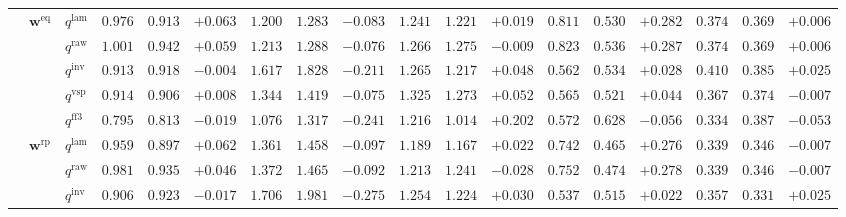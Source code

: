\documentclass[eng]{kjas3}
\begin{document}
\begin{table}[t]
{\begin{tabular}{lll ccc ccc ccc ccc ccc}
\cmidrule(lr){2-18}
 & $\mathbf{w}^{\mathrm{eq}}$ & $q^{\mathrm{lam}}$ & $0.976$ & $0.913$ & \cellcolor{posgreen!50}$+0.063$ & $1.200$ & $1.283$ & \cellcolor{negred!50}$-0.083$ & $1.241$ & $1.221$ & \cellcolor{posgreen!50}$+0.019$ & $0.811$ & $0.530$ & \cellcolor{posgreen!50}$+0.282$ & $0.374$ & $0.369$ & \cellcolor{posgreen!50}$+0.006$ \\
 &  & $q^{\mathrm{raw}}$ & $1.001$ & $0.942$ & \cellcolor{posgreen!50}$+0.059$ & $1.213$ & $1.288$ & \cellcolor{negred!50}$-0.076$ & $1.266$ & $1.275$ & \cellcolor{negred!50}$-0.009$ & $0.823$ & $0.536$ & \cellcolor{posgreen!50}$+0.287$ & $0.374$ & $0.369$ & \cellcolor{posgreen!50}$+0.006$ \\
 &  & $q^{\mathrm{inv}}$ & $0.913$ & $0.918$ & \cellcolor{negred!50}$-0.004$ & $1.617$ & $1.828$ & \cellcolor{negred!50}$-0.211$ & $1.265$ & $1.217$ & \cellcolor{posgreen!50}$+0.048$ & $0.562$ & $0.534$ & \cellcolor{posgreen!50}$+0.028$ & $0.410$ & $0.385$ & \cellcolor{posgreen!50}$+0.025$ \\
 &  & $q^{\mathrm{vsp}}$ & $0.914$ & $0.906$ & \cellcolor{posgreen!50}$+0.008$ & $1.344$ & $1.419$ & \cellcolor{negred!50}$-0.075$ & $1.325$ & $1.273$ & \cellcolor{posgreen!50}$+0.052$ & $0.565$ & $0.521$ & \cellcolor{posgreen!50}$+0.044$ & $0.367$ & $0.374$ & \cellcolor{negred!50}$-0.007$ \\
 &  & $q^{\mathrm{ff3}}$ & $0.795$ & $0.813$ & \cellcolor{negred!50}$-0.019$ & $1.076$ & $1.317$ & \cellcolor{negred!50}$-0.241$ & $1.216$ & $1.014$ & \cellcolor{posgreen!50}$+0.202$ & $0.572$ & $0.628$ & \cellcolor{negred!50}$-0.056$ & $0.334$ & $0.387$ & \cellcolor{negred!50}$-0.053$ \\
\cmidrule(lr){2-18}
 & $\mathbf{w}^{\mathrm{rp}}$ & $q^{\mathrm{lam}}$ & $0.959$ & $0.897$ & \cellcolor{posgreen!50}$+0.062$ & $1.361$ & $1.458$ & \cellcolor{negred!50}$-0.097$ & $1.189$ & $1.167$ & \cellcolor{posgreen!50}$+0.022$ & $0.742$ & $0.465$ & \cellcolor{posgreen!50}$+0.276$ & $0.339$ & $0.346$ & \cellcolor{negred!50}$-0.007$ \\
 &  & $q^{\mathrm{raw}}$ & $0.981$ & $0.935$ & \cellcolor{posgreen!50}$+0.046$ & $1.372$ & $1.465$ & \cellcolor{negred!50}$-0.092$ & $1.213$ & $1.241$ & \cellcolor{negred!50}$-0.028$ & $0.752$ & $0.474$ & \cellcolor{posgreen!50}$+0.278$ & $0.339$ & $0.346$ & \cellcolor{negred!50}$-0.007$ \\
 &  & $q^{\mathrm{inv}}$ & $0.906$ & $0.923$ & \cellcolor{negred!50}$-0.017$ & $1.706$ & $1.981$ & \cellcolor{negred!50}$-0.275$ & $1.254$ & $1.224$ & \cellcolor{posgreen!50}$+0.030$ & $0.537$ & $0.515$ & \cellcolor{posgreen!50}$+0.022$ & $0.357$ & $0.331$ & \cellcolor{posgreen!50}$+0.025$ \\

\end{tabular}}
\end{table}
\end{document}
